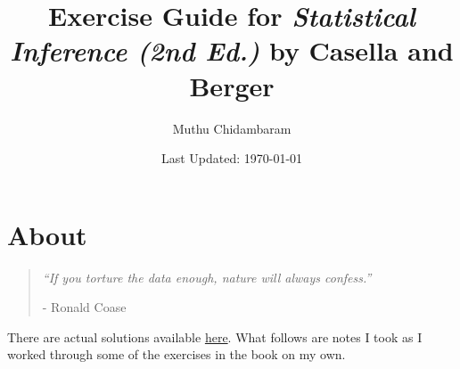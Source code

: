 \documentclass{article}
\begin{document}
\title{Exercise Guide for \textit{Statistical Inference (2nd Ed.)} by Casella and Berger}
\author{Muthu Chidambaram}
\date{Last Updated: \today}

\maketitle

\tableofcontents
\newpage 

\section*{About}

\begin{quote}
        \textit{``If you torture the data enough, nature will always confess.''} 
        
        - Ronald Coase
\end{quote}

There are actual solutions available
\href{http://contacts.ucalgary.ca/info/math/files/info/unitis/courses/STAT723/W2010/LEC1/STAT723-W10-LEC1-Publisher%27s-Solution-to-All-Problems-in-Text.pdf}{here}. What follows are notes I took as
I worked through some of the exercises in the book on my own. 




\end{document}
